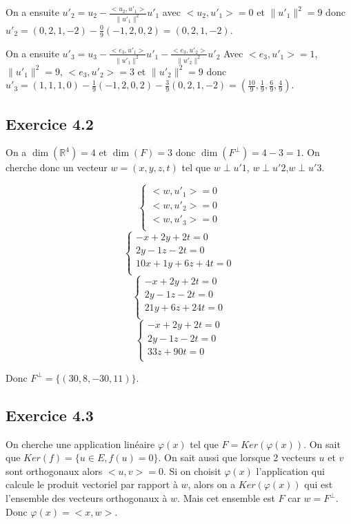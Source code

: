 \documentclass[]{book}
\theoremstyle{definition}
\newcommand{\bb}[1]{\mathbb{#1}}
\newcommand{\R}{\bb{R}}
\begin{document}
On a ensuite $u'_2 = u_2 - \frac{<u_2, u'_1>}{\lVert u'_1 \rVert^2}u'_1$  avec $<u_2, u'_1> = 0$ et $\lVert u'_1 \rVert^2 = 9$ donc $u'_2 = (0,2,1,-2) - \frac{0}{9} (-1, 2, 0, 2) = (0,2,1,-2)$.

On a ensuite $u'_3 = u_3 - \frac{<e_3, u'_1>}{\lVert u'_1 \rVert^2}u'_1 - \frac{<e_3, u'_2>}{\lVert u'_2 \rVert^2}u'_2$
Avec $<e_3, u'_1> = 1$, $\lVert u'_1 \rVert^2 = 9$, $<e_3, u'_2> = 3$ et $\lVert u'_2 \rVert^2 = 9$ donc $u'_3 = (1,1,1,0) - \frac{1}{9} (-1,2,0,2) - \frac{3}{9}(0,2,1,-2) = (\frac{10}{9}, \frac{1}{9}, \frac{6}{9}, \frac{4}{9})$.

\subsection*{Exercice 4.2}
On a $\dim(\R^4) = 4$ et $\dim(F) =3 $ donc $\dim(F^{\perp}) = 4 - 3 = 1$. On cherche donc un vecteur $w=(x,y,z,t)$ tel que $w \perp u'1$, $w \perp u'2$,$w \perp u'3$.

$$
\left\{
    \begin{array}{l}
        <w, u'_1> = 0 \\
        <w, u'_2> = 0 \\
        <w, u'_3> = 0 \\
    \end{array}
\right.
$$
$$
\left\{
    \begin{array}{l}
        -x + 2y + 2t = 0 \\
        2y - 1z -2t = 0 \\
        10x + 1y + 6z + 4t = 0 \\
    \end{array}
\right.
$$
$$
\left\{
    \begin{array}{l}
        -x + 2y + 2t = 0 \\
             2y - 1z -2t = 0 \\
             21y + 6z + 24t = 0 \\
    \end{array}
\right.
$$
$$
\left\{
    \begin{array}{l}
        -x + 2y + 2t = 0 \\
             2y - 1z -2t = 0 \\
                 33z + 90t = 0 \\
    \end{array}
\right.
$$


Donc $F^{\perp} = \{(30,8,-30,11)\} $.

\subsection*{Exercice 4.3}
On cherche une application lin\'eaire $\varphi(x)$ tel que $F = Ker(\varphi(x))$. On sait que $Ker(f) = \{u \in E, f(u) = 0 \}$. On sait aussi que lorsque 2 vecteurs $u$ et $v$ sont orthogonaux alors $<u, v> = 0$. Si on choisit $\varphi(x) $ l'application qui calcule le produit vectoriel par rapport \`a $w$, alors on a $Ker(\varphi(x))$ qui est l'ensemble des vecteurs orthogonaux \`a $w$. Mais cet ensemble est $F$ car $w = F^{\perp}$. Donc $\varphi(x) = <x, w>$.  
\end{document}
